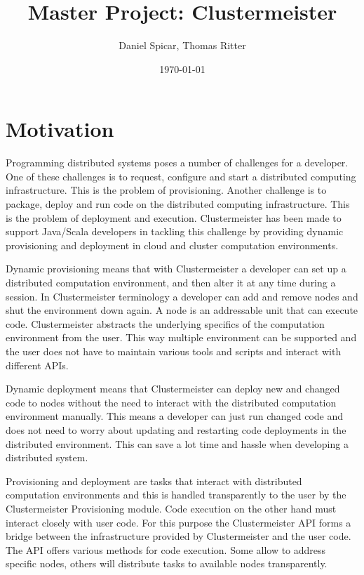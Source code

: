 \documentclass[english]{uzhpub}
\begin{document}
\title{Master Project: Clustermeister}


\author{Daniel Spicar, Thomas Ritter}

\date{\today}

\maketitle


\section{Motivation}

Programming distributed systems poses a number of challenges for a developer. One of these challenges is to request, configure and start a distributed computing infrastructure. This is the problem of provisioning. Another challenge is to package, deploy and run code on the distributed computing infrastructure. This is the problem of deployment and execution. Clustermeister has been made to support Java/Scala developers in tackling this challenge by providing dynamic provisioning and deployment in cloud and cluster computation environments.

Dynamic provisioning means that with Clustermeister a developer can set up a distributed computation environment, and then alter it at any time during a session. In Clustermeister terminology a developer can add and remove nodes and shut the environment down again. A node is an addressable unit that can execute code. Clustermeister abstracts the underlying specifics of the computation environment from the user. This way multiple environment can be supported and the user does not have to maintain various tools and scripts and interact with different APIs.

Dynamic deployment means that Clustermeister can deploy new and changed code to nodes without the need to interact with the distributed computation environment manually. This means a developer can just run changed code and does not need to worry about updating and restarting code deployments in the distributed environment. This can save a lot time and hassle when developing a distributed system.

Provisioning and deployment are tasks that interact with distributed computation environments and this is handled transparently to the user by the Clustermeister Provisioning module. Code execution on the other hand must interact closely with user code. For this purpose the Clustermeister API forms a bridge between the infrastructure provided by Clustermeister and the user code. The API offers various methods for code execution. Some allow to address specific nodes, others will distribute tasks to available nodes transparently.
\end{document}
